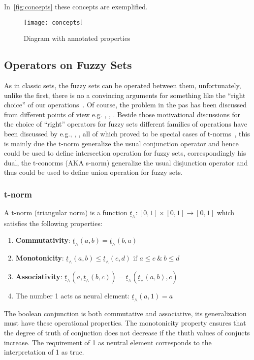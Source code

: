 \documentclass[]{article}
\newcommand{\tnorm}{\underline{t}_{\land}}
\begin{document}
In~\autoref{fig:concepts} these concepts are exemplified.

\begin{figure}[ht!]
  \centering
  \texttt{[image: concepts]} %
  \caption{Diagram with annotated properties\label{fig:concepts}}
\end{figure}

\subsection{Operators on Fuzzy Sets}
As in classic sets, the fuzzy sets can be operated between them, unfortunately,
unlike the first, there is no a convincing arguments for something like the
``right choice'' of our operations~\citep{Zadeh1965}. Of course, the problem in
the pas has been discussed from different points of view e.g. \citet{Bellman1973},
\citet{Yager1979}, \citet{Giles1979}. Beside those motivational discussions for
the choice of ``right'' operators for fuzzy sets different families of operations
have been discussed by e.g.\citet{Yager1980}, \citet{Dombi1982}, \citet{Weber1983},
all of which proved to be special cases of t-norms~\citep{Schweizer1961}, this is
mainly due the t-norm generalize the usual conjunction operator and hence could
be used to define intersection operation for fuzzy sets, correspondingly his dual,
the t-conorms (AKA s-norm) generalize the usual disjunction operator and thus
could be used to define union operation for fuzzy sets.
\subsubsection{t-norm~\citep{Schweizer1961}}
A t-norm (triangular norm) is a function $\tnorm: [0, 1] \times [0, 1] \to [0, 1] $
which satisfies the following properties:
\begin{enumerate}
  \item \textbf{Commutativity}: $\tnorm(a, b) = \tnorm(b, a)$
  \item \textbf{Monotonicity}: $\tnorm(a, b) \leq \tnorm(c, d)\text{ if } a \leq c\ \&\ b \leq d$
  \item \textbf{Associativity}: $\tnorm(a, \tnorm(b, c)) = \tnorm(\tnorm(a, b), c)$
  \item The number 1 acts as neural element: $\tnorm(a, 1) = a$
\end{enumerate}
The boolean conjunction is both commutative and associative, its generalization
must have these operational properties. The monotonicity property ensures that
the degree of truth of conjuction does not decrease if the thuth values of
conjucts increase. The requirement of 1 as neutral element corresponds to the
interpretation of 1 as true.
\end{document}
